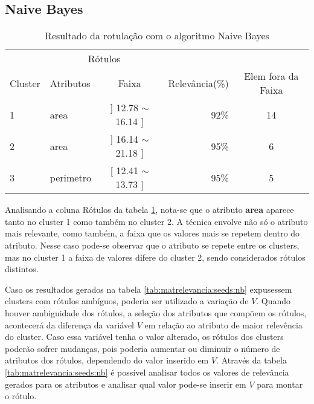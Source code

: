 \subsection{Naive Bayes} \label{cap:resultados:ssec:seed:nb}
\begin{table}[!h]
\centering
\caption{Resultado da rotulação com o algoritmo Naive Bayes}
\label{tab:rot:seeds:nb}
\begin{tabular}{llcrc}
\hline \hline
\multicolumn{1}{c}{\cellcolor[HTML]{FFFFFF}} & \multicolumn{2}{c}{Rótulos}                & \multicolumn{1}{r}{}               & \\ \cline{2-3}
Cluster                                      & Atributos      & \multicolumn{1}{c}{Faixa} & \multicolumn{1}{c}{Relevância(\%)} & Elem fora da Faixa\\ \hline \hline
1                                            & area           & ] 12.78 $\sim$  16.14 ]   & 92\%                               & 14\\  \hline
2                                            & area           & ] 16.14 $\sim$  21.18 ]   & 95\%                               & 6\\ \hline
3                                            & perimetro      & [ 12.41 $\sim$  13.73 ]   & 95\%                               & 5\\ \hline \hline
\end{tabular}
\end{table}



Analisando a coluna Rótulos da tabela \ref{tab:rot:seeds:nb}, nota-se que o atributo \textbf{area} aparece tanto no  cluster 1 como também no cluster 2. A técnica envolve não só o atributo mais relevante, como também, a faixa que os valores mais se repetem dentro do atributo. Nesse caso pode-se observar que o atributo se repete entre os clusters, mas no cluster 1 a faixa de valores difere do cluster 2, sendo considerados rótulos distintos.


Caso os resultados gerados na tabela \ref{tab:matrelevancia:seeds:nb} expusessem clusters com rótulos ambíguos, poderia ser utilizado a variação de ${V}$. Quando houver ambiguidade dos rótulos, a seleção dos atributos que compõem os rótulos, acontecerá da diferença da variável ${V}$ em relação ao atributo de maior relevência do cluster. Caso essa variável tenha o valor alterado, os rótulos dos clusters poderão sofrer mudanças, pois poderia aumentar  ou diminuir o número de atributos dos rótulos, dependendo do valor inserido em ${V}$. Através da tabela \ref{tab:matrelevancia:seeds:nb} é possível analisar todos os valores de relevância gerados para os atributos e analisar qual valor pode-se inserir em ${V}$ para montar o rótulo.

